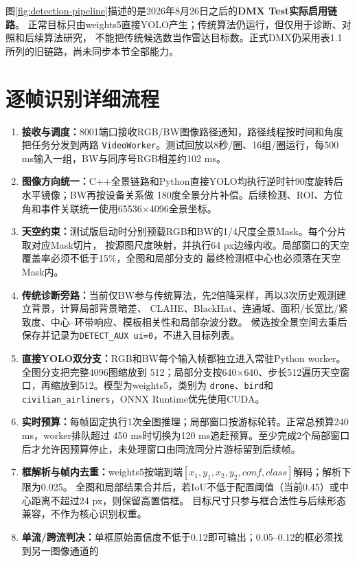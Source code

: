 \documentclass[UTF8,a4paper,11pt,openany]{ctexrep}
\begin{document}
图\ref{fig:detection-pipeline}描述的是2026年8月26日之后的\textbf{DMX Test实际启用链路}。
正常目标只由weights5直接YOLO产生；传统算法仍运行，但仅用于诊断、对照和后续算法研究，
不能把传统候选数当作雷达目标数。正式DMX仍采用表1.1所列的旧链路，尚未同步本节全部能力。

\section{逐帧识别详细流程}

\begin{enumerate}
  \item \textbf{接收与调度：}8001端口接收RGB/BW图像路径通知，路径线程按时间和角度把任务分发到两路
  \texttt{VideoWorker}。测试回放以8秒/圈、16组/圈运行，每500 ms输入一组，BW与同序号RGB相差约102 ms。
  \item \textbf{图像方向统一：}C++全景链路和Python直接YOLO均执行逆时针90度旋转后水平镜像；BW再按设备关系做
  180度全景分片补偿。后续检测、ROI、方位角和事件关联统一使用65536$\times$4096全景坐标。
  \item \textbf{天空约束：}测试版启动时分别预载RGB和BW的1/4尺度全景Mask。每个分片取对应Mask切片，
  按源图尺度映射，并执行64 px边缘内收。局部窗口的天空覆盖率必须不低于15\%，全图和局部分支的
  最终检测框中心也必须落在天空Mask内。
  \item \textbf{传统诊断旁路：}当前仅BW参与传统算法，先2倍降采样，再以3次历史观测建立背景，计算局部背景暗差、
  CLAHE、BlackHat、连通域、面积/长宽比/紧致度、中心--环带响应、模板相关性和局部杂波分数。
  候选按全景空间去重后保存并记录为\texttt{DETECT\_AUX ui=0}，不进入目标列表。
  \item \textbf{直接YOLO双分支：}RGB和BW每个输入帧都独立进入常驻Python worker。全图分支把完整4096图缩放到
  512；局部分支按640$\times$640、步长512遍历天空窗口，再缩放到512。模型为weights5，类别为
  \texttt{drone}、\texttt{bird}和\texttt{civilian\_airliners}，ONNX Runtime优先使用CUDA。
  \item \textbf{实时预算：}每帧固定执行1次全图推理；局部窗口按游标轮转。正常总预算240 ms，worker排队超过
  450 ms时切换为120 ms追赶预算。至少完成2个局部窗口后才允许因预算停止，未处理窗口由同流同分片游标留到后续帧。
  \item \textbf{框解析与帧内去重：}weights5按端到端$[x_1,y_1,x_2,y_2,conf,class]$解码；解析下限为0.025。
  全图和局部结果合并后，若IoU不低于配置阈值（当前0.45）或中心距离不超过24 px，则保留高置信框。
  目标尺寸只参与框合法性与后续形态兼容，不作为核心识别权重。
  \item \textbf{单流/跨流判决：}单框原始置信度不低于0.12即可输出；0.05--0.12的框必须找到另一图像通道的

\end{enumerate}
\end{document}

